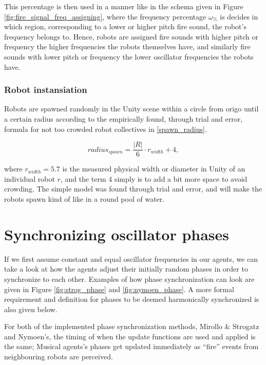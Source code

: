 			This percentage is then used in a manner like in the schema given in Figure \ref{fig:fire_signal_freq_assigning}, where the frequency percentage $\omega_\%$ is decides in which region, corresponding to a lower or higher pitch fire sound, the robot's frequency belongs to. Hence, robots are assigned fire sounds with higher pitch or frequency the higher frequencies the robots themselves have, and similarly fire sounds with lower pitch or frequency the lower oscillator frequencies the robots have.

		\subsubsection{Robot instansiation}
		
		Robots are spawned randomly in the Unity scene within a circle from origo until a certain radius according to the empirically found, through trial and error, formula for not too crowded robot collectives in \eqref{spawn_radius}.
		
		\begin{equation}\label{spawn_radius}
			radius_{spawn} = \frac{|R|}{6} \cdot r_{width} + 4,
		\end{equation}
		
		where $r_{width} = 5.7$ is the measured physical width or diameter in Unity of an individual robot $r$, and the term 4 simply is to add a bit more space to avoid crowding. The simple model was found through trial and error, and will make the robots spawn kind of like in a round pool of water.




\section{Synchronizing oscillator phases}
\label{sec:phase_methods}
	If we first assume constant and equal oscillator frequencies in our agents, we can take a look at how the agents adjust their initially random phases in order to synchronize to each other. Examples of how phase synchronization can look are given in Figure \ref{fig:strog_phase} and \ref{fig:nymoen_phase}. A more formal requirement and definition for phases to be deemed harmonically synchronized is also given below.
	
	For both of the implemented phase synchronization methods, Mirollo \& Strogatz and Nymoen's, the timing of when the update functions are used and applied is the same; Musical agents's phases get updated immediately as ``fire'' events from neighbouring robots are perceived. \nl
	
